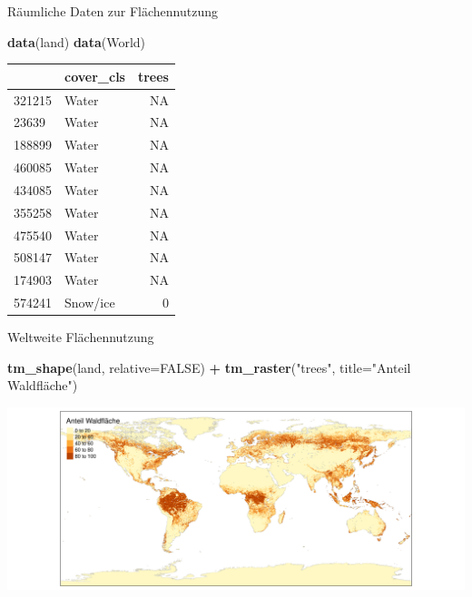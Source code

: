 \documentclass[ignorenonframetext,]{beamer}
\newenvironment{Shaded}{\begin{snugshade}}{\end{snugshade}}
\newcommand{\DataTypeTok}[1]{\textcolor[rgb]{0.13,0.29,0.53}{#1}}
\newcommand{\KeywordTok}[1]{\textcolor[rgb]{0.13,0.29,0.53}{\textbf{#1}}}
\newcommand{\NormalTok}[1]{#1}
\newcommand{\OperatorTok}[1]{\textcolor[rgb]{0.81,0.36,0.00}{\textbf{#1}}}
\newcommand{\OtherTok}[1]{\textcolor[rgb]{0.56,0.35,0.01}{#1}}
\newcommand{\StringTok}[1]{\textcolor[rgb]{0.31,0.60,0.02}{#1}}
\begin{document}
\begin{frame}[fragile]{Räumliche Daten zur Flächennutzung}
\protect\hypertarget{raumliche-daten-zur-flachennutzung}{}

\begin{Shaded}
\begin{Highlighting}[]
\KeywordTok{data}\NormalTok{(land)}
\KeywordTok{data}\NormalTok{(World)}
\end{Highlighting}
\end{Shaded}

\begin{longtable}[]{@{}llr@{}}
\toprule
& cover\_cls & trees\tabularnewline
\midrule
\endhead
321215 & Water & NA\tabularnewline
23639 & Water & NA\tabularnewline
188899 & Water & NA\tabularnewline
460085 & Water & NA\tabularnewline
434085 & Water & NA\tabularnewline
355258 & Water & NA\tabularnewline
475540 & Water & NA\tabularnewline
508147 & Water & NA\tabularnewline
174903 & Water & NA\tabularnewline
574241 & Snow/ice & 0\tabularnewline
\bottomrule
\end{longtable}

\end{frame}

\begin{frame}[fragile]{Weltweite Flächennutzung}
\protect\hypertarget{weltweite-flachennutzung}{}

\begin{Shaded}
\begin{Highlighting}[]
\KeywordTok{tm_shape}\NormalTok{(land,  }\DataTypeTok{relative=}\OtherTok{FALSE}\NormalTok{) }\OperatorTok{+}
\StringTok{    }\KeywordTok{tm_raster}\NormalTok{(}\StringTok{"trees"}\NormalTok{, }\DataTypeTok{title=}\StringTok{"Anteil Waldfläche"}\NormalTok{)}
\end{Highlighting}
\end{Shaded}

\includegraphics{A4_tmap_files/figure-beamer/unnamed-chunk-39-1.pdf}

\end{frame}
\end{document}
